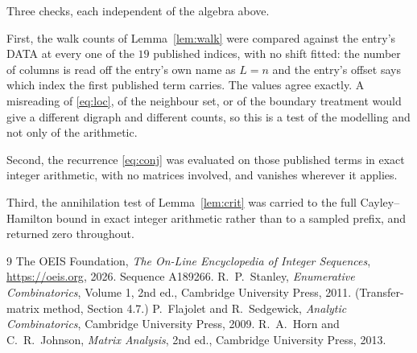 \documentclass[11pt,a4paper]{article}
\theoremstyle{plain}
\theoremstyle{definition}
\begin{document}
Three checks, each independent of the algebra above.

First, the walk counts of Lemma~\ref{lem:walk} were compared against the entry's DATA at
every one of the $19$ published indices, with no shift fitted: the number of columns is
read off the entry's own name as $L=n$ and the entry's offset says which index the first
published term carries. The values agree exactly. A misreading of \eqref{eq:loc}, of the
neighbour set, or of the boundary treatment would give a different digraph and different
counts, so this is a test of the modelling and not only of the arithmetic.

Second, the recurrence \eqref{eq:conj} was evaluated on those published terms in exact
integer arithmetic, with no matrices involved, and vanishes wherever it applies.

Third, the annihilation test of Lemma~\ref{lem:crit} was carried to the full
Cayley--Hamilton bound in exact integer arithmetic rather than to a sampled prefix, and
returned zero throughout.

\begin{thebibliography}{9}
 The OEIS Foundation, \emph{The On-Line Encyclopedia of Integer
Sequences}, \url{https://oeis.org}, 2026. Sequence A189266.
 R.~P.~Stanley, \emph{Enumerative Combinatorics}, Volume 1, 2nd ed.,
Cambridge University Press, 2011. (Transfer-matrix method, Section 4.7.)
 P.~Flajolet and R.~Sedgewick, \emph{Analytic Combinatorics}, Cambridge
University Press, 2009.
 R.~A.~Horn and C.~R.~Johnson, \emph{Matrix Analysis}, 2nd ed., Cambridge
University Press, 2013.
\end{thebibliography}
\end{document}
